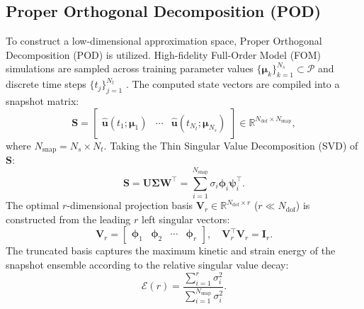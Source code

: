 \subsection{Proper Orthogonal Decomposition (POD)}
\label{subsec:pod_formulation}
To construct a low-dimensional approximation space, Proper Orthogonal Decomposition (POD) \cite{berkooz1993, willcox2002} is utilized. High-fidelity Full-Order Model (FOM) simulations are sampled across training parameter values $\{\bm{\mu}_k\}_{k=1}^{N_s} \subset \mathcal{P}$ and discrete time steps $\{t_j\}_{j=1}^{N_t}$ \cite{Benner2015, quarteroni2014}. The computed state vectors are compiled into a snapshot matrix:
\begin{equation}
    \bm{S} = \begin{bmatrix} \hat{\bm{u}}(t_1; \bm{\mu}_1) & \cdots & \hat{\bm{u}}(t_{N_t}; \bm{\mu}_{N_s}) \end{bmatrix} \in \mathbb{R}^{N_{\text{dof}} \times N_{\text{snap}}},
\end{equation}
where $N_{\text{snap}} = N_s \times N_t$. Taking the Thin Singular Value Decomposition (SVD) of $\bm{S}$:
\begin{equation}
    \bm{S} = \bm{U} \bm{\Sigma} \bm{W}^\top = \sum_{i=1}^{N_{\text{snap}}} \sigma_i \bm{\phi}_i \bm{\psi}_i^\top.
\end{equation}
The optimal $r$-dimensional projection basis $\bm{V}_r \in \mathbb{R}^{N_{\text{dof}} \times r}$ ($r \ll N_{\text{dof}}$) is constructed from the leading $r$ left singular vectors:
\begin{equation}
    \bm{V}_r = \begin{bmatrix} \bm{\phi}_1 & \bm{\phi}_2 & \cdots & \bm{\phi}_r \end{bmatrix}, \quad \bm{V}_r^\top \bm{V}_r = \bm{I}_r.
\end{equation}
The truncated basis captures the maximum kinetic and strain energy of the snapshot ensemble according to the relative singular value decay:
\begin{equation}
    \mathcal{E}(r) = \frac{\sum_{i=1}^r \sigma_i^2}{\sum_{i=1}^{N_{\text{snap}}} \sigma_i^2}.
\end{equation}


